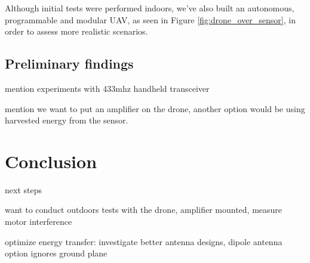 \documentclass[conference]{IEEEtran}
\begin{document}
Although initial tests were performed indoors, we've also built an autonomous, programmable and modular UAV, as seen in Figure \ref{fig:drone_over_sensor}, in order to assess more realistic scenarios.

\subsection{Preliminary findings}

mention experiments with 433mhz handheld transceiver

mention we want to put an amplifier on the drone, another option would be using harvested energy from the sensor.

\section{Conclusion}

next steps

want to conduct outdoors tests with the drone, amplifier mounted, measure motor interference

optimize energy transfer: investigate better antenna designs, dipole antenna option ignores ground plane



\end{document}

